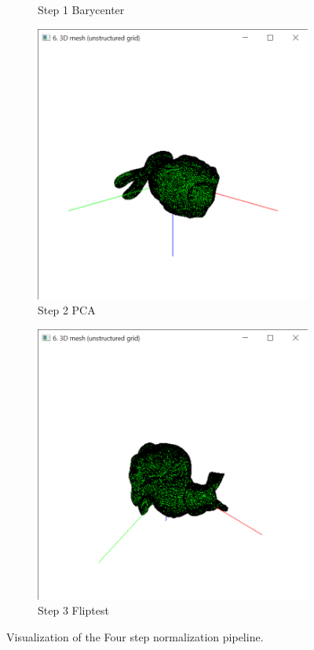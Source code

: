 \documentclass{bigdata}
\begin{document}
\begin{figure}[t!]
\begin{subfigure}[b]{0.4\linewidth}
		\caption{Step 1 Barycenter}
	\end{subfigure}
	\begin{subfigure}[b]{0.4\linewidth}
		\includegraphics[width=\linewidth]{Pictures/Part2/step2.png}
		\caption{Step 2 PCA}
	\end{subfigure}
	\begin{subfigure}[b]{0.4\linewidth}
		\includegraphics[width=\linewidth]{Pictures/Part2/step3.png}
		\caption{Step 3 Fliptest}
	\end{subfigure}
	\caption{Visualization of the Four step normalization pipeline.}
	\label{fig:bunny}
\end{figure}
\end{document}
